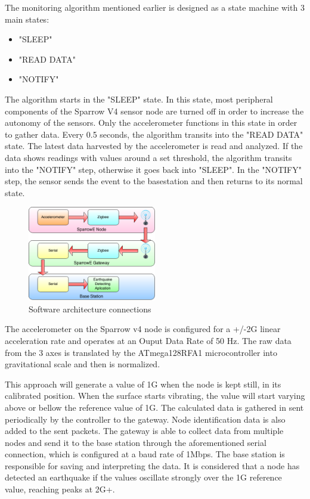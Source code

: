 The monitoring algorithm mentioned earlier is designed as a state machine with 3 main states: 
\begin{itemize}
    \item "SLEEP"
    \item "READ DATA"
    \item "NOTIFY"
\end{itemize}
The algorithm starts in the "SLEEP" state. In this state, most peripheral components of the Sparrow V4 sensor node are turned off in order to increase the autonomy of the sensors. Only 
the accelerometer functions in this state in order to gather data. Every 0.5 seconds, the algorithm transits into the "READ DATA" state. The latest data harvested 
by the accelerometer is read and analyzed. If the data shows readings with values around a set threshold, the algorithm transits into the "NOTIFY" step, otherwise it goes back 
into "SLEEP". In the "NOTIFY" step, the sensor sends the event to the basestation and then returns to its normal state.

\begin{figure}[ht] \centering
  \includegraphics[width=0.5\textwidth]{img/software-architecture.png}
  \caption{Software architecture connections}
\end{figure}

The accelerometer on the Sparrow v4 node is configured for a +/-2G linear acceleration rate and operates at an Ouput Data Rate of 50 Hz. 
The raw data from the 3 axes is translated by the ATmega128RFA1 microcontroller into gravitational scale and then is normalized.

This approach will generate a value of 1G when the node is kept still, in its calibrated position. When the surface starts vibrating, the value will start varying 
above or bellow the reference value of 1G. The calculated data is gathered in sent periodically by the controller to the 
gateway. Node identification data is also added to the sent packets. The gateway is able to collect data from multiple nodes and send it to the base station through
the aforementioned serial connection, which is configured at a baud rate of 1Mbps. The base station is responsible for saving and interpreting the data. 
It is considered that a node has detected an earthquake if the values oscillate strongly over the 1G reference value, reaching peaks at 2G+.

